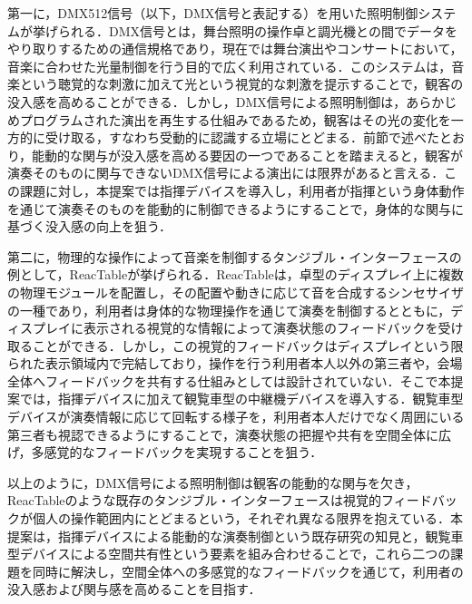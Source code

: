 第一に，DMX512信号（以下，DMX信号と表記する）を用いた照明制御システムが挙げられる．DMX信号とは，舞台照明の操作卓と調光機との間でデータをやり取りするための通信規格であり，現在では舞台演出やコンサートにおいて，音楽に合わせた光量制御を行う目的で広く利用されている\cite{sekine2021}．このシステムは，音楽という聴覚的な刺激に加えて光という視覚的な刺激を提示することで，観客の没入感を高めることができる．しかし，DMX信号による照明制御は，あらかじめプログラムされた演出を再生する仕組みであるため，観客はその光の変化を一方的に受け取る，すなわち受動的に認識する立場にとどまる．前節で述べたとおり，能動的な関与が没入感を高める要因の一つであることを踏まえると，観客が演奏そのものに関与できないDMX信号による演出には限界があると言える．この課題に対し，本提案では指揮デバイスを導入し，利用者が指揮という身体動作を通じて演奏そのものを能動的に制御できるようにすることで，身体的な関与に基づく没入感の向上を狙う．

第二に，物理的な操作によって音楽を制御するタンジブル・インターフェースの例として，ReacTableが挙げられる．ReacTableは，卓型のディスプレイ上に複数の物理モジュールを配置し，その配置や動きに応じて音を合成するシンセサイザの一種であり，利用者は身体的な物理操作を通じて演奏を制御するとともに，ディスプレイに表示される視覚的な情報によって演奏状態のフィードバックを受け取ることができる\cite{reactable}．しかし，この視覚的フィードバックはディスプレイという限られた表示領域内で完結しており，操作を行う利用者本人以外の第三者や，会場全体へフィードバックを共有する仕組みとしては設計されていない．そこで本提案では，指揮デバイスに加えて観覧車型の中継機デバイスを導入する．観覧車型デバイスが演奏情報に応じて回転する様子を，利用者本人だけでなく周囲にいる第三者も視認できるようにすることで，演奏状態の把握や共有を空間全体に広げ，多感覚的なフィードバックを実現することを狙う．

以上のように，DMX信号による照明制御は観客の能動的な関与を欠き，ReacTableのような既存のタンジブル・インターフェースは視覚的フィードバックが個人の操作範囲内にとどまるという，それぞれ異なる限界を抱えている．本提案は，指揮デバイスによる能動的な演奏制御という既存研究の知見と，観覧車型デバイスによる空間共有性という要素を組み合わせることで，これら二つの課題を同時に解決し，空間全体への多感覚的なフィードバックを通じて，利用者の没入感および関与感を高めることを目指す．
